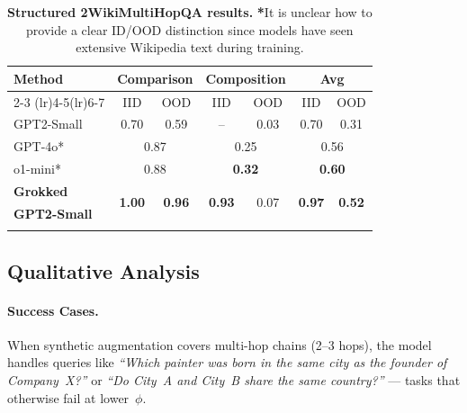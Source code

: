         \begin{table}[ht!]
            \small
            \centering            
            \caption{
                \textbf{Structured 2WikiMultiHopQA results.} 
                \textbf{*}It is unclear how to provide a clear ID/OOD distinction since models have seen extensive Wikipedia text during training.
            }
            \vskip 0.1in
            \begin{tabular}{lcccccc}
            \toprule
            \multirow{2}{*}{\bf Method} & \multicolumn{2}{c}{\bf Comparison} & \multicolumn{2}{c}{\bf Composition} &
            \multicolumn{2}{c}{\bf Avg}\\
            \cmidrule(lr){2-3} \cmidrule(lr){4-5}\cmidrule(lr){6-7} 
                 & IID & OOD & IID & OOD & IID & OOD \\
            \midrule
            GPT2-Small        & 0.70 & 0.59 & -- & 0.03 & 0.70 & 0.31 \\
            GPT-4o*            & \multicolumn{2}{c}{0.87} & \multicolumn{2}{c}{0.25} & \multicolumn{2}{c}{0.56}\\
            o1-mini*           & \multicolumn{2}{c}{0.88} & \multicolumn{2}{c}{\bf 0.32} & \multicolumn{2}{c}{\bf 0.60}\\
            \midrule
            {\bf Grokked} & \multirow{2}{*}{\bf 1.00} & \multirow{2}{*}{\bf 0.96} & \multirow{2}{*}{\bf 0.93} & \multirow{2}{*}{0.07} & \multirow{2}{*}{\bf 0.97} & \multirow{2}{*}{\bf 0.52}\\
            {\bf GPT2-Small} \\
            \bottomrule
            \label{tab:accuracy}
            
            \end{tabular}
        \end{table}
    
    \subsection{Qualitative Analysis}\label{sec:exp_qual_analysis}
        \paragraph{Success Cases.}
            When synthetic augmentation covers multi-hop chains (2--3 hops), 
            the model handles queries like 
            \emph{``Which painter was born in the same city as the founder of Company~X?''} 
            or 
            \emph{``Do City~A and City~B share the same country?''} 
            --- tasks that otherwise fail at lower~\(\phi\).
        
